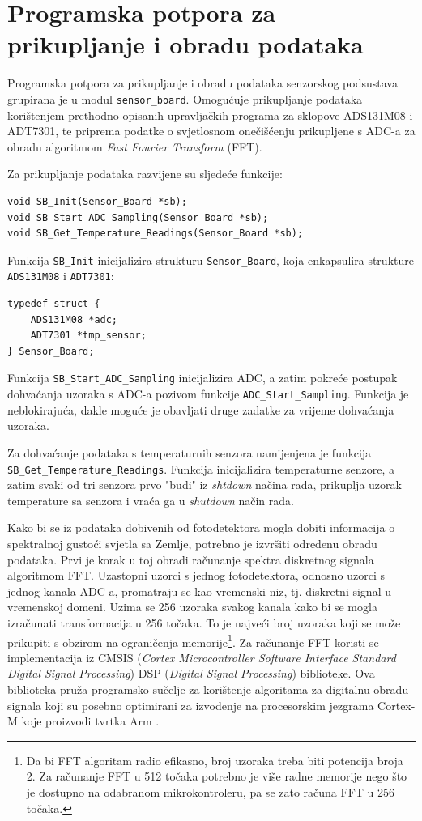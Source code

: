 \section{Programska potpora za prikupljanje i obradu podataka} \label{obrada}

Programska potpora za prikupljanje i obradu podataka senzorskog podsustava grupirana je u modul \texttt{sensor\_board}. Omogućuje prikupljanje podataka korištenjem prethodno opisanih upravljačkih programa za sklopove ADS131M08 i ADT7301, te priprema podatke o svjetlosnom onečišćenju prikupljene s ADC-a za obradu algoritmom \textit{Fast Fourier Transform} (FFT).

Za prikupljanje podataka razvijene su sljedeće funkcije:
\begin{lstlisting}
void SB_Init(Sensor_Board *sb);
void SB_Start_ADC_Sampling(Sensor_Board *sb);
void SB_Get_Temperature_Readings(Sensor_Board *sb);
\end{lstlisting}

Funkcija \texttt{SB\_Init} inicijalizira strukturu \texttt{Sensor\_Board}, koja enkapsulira strukture \texttt{ADS131M08} i \texttt{ADT7301}:
\begin{lstlisting}
typedef struct {
    ADS131M08 *adc;
    ADT7301 *tmp_sensor;
} Sensor_Board;
\end{lstlisting}

Funkcija \texttt{SB\_Start\_ADC\_Sampling} inicijalizira ADC, a zatim pokreće postupak dohvaćanja uzoraka s ADC-a pozivom funkcije \texttt{ADC\_Start\_Sampling}. Funkcija je neblokirajuća, dakle moguće je obavljati druge zadatke za vrijeme dohvaćanja uzoraka.

Za dohvaćanje podataka s temperaturnih senzora namijenjena je funkcija \\\texttt{SB\_Get\_Temperature\_Readings}. Funkcija inicijalizira temperaturne senzore, a zatim svaki od tri senzora prvo "budi" iz \textit{shtdown} načina rada, prikuplja uzorak temperature sa senzora i vraća ga u \textit{shutdown} način rada.

Kako bi se iz podataka dobivenih od fotodetektora mogla dobiti informacija o spektralnoj gustoći svjetla sa Zemlje, potrebno je izvršiti određenu obradu podataka. Prvi je korak u toj obradi računanje spektra diskretnog signala algoritmom FFT. Uzastopni uzorci s jednog fotodetektora, odnosno uzorci s jednog kanala ADC-a, promatraju se kao vremenski niz, tj. diskretni signal u vremenskoj domeni. Uzima se 256 uzoraka svakog kanala kako bi se mogla izračunati transformacija u 256 točaka. To je najveći broj uzoraka koji se može prikupiti s obzirom na ograničenja memorije\footnote{Da bi FFT algoritam radio efikasno, broj uzoraka treba biti potencija broja 2. Za računanje FFT u 512 točaka potrebno je više radne memorije nego što je dostupno na odabranom mikrokontroleru, pa se zato računa FFT u 256 točaka.}. Za računanje FFT koristi se implementacija iz CMSIS (\textit{Cortex Microcontroller Software Interface Standard Digital Signal Processing}) DSP (\textit{Digital Signal Processing}) biblioteke. Ova biblioteka pruža programsko sučelje za korištenje algoritama za digitalnu obradu signala koji su posebno optimirani za izvođenje na procesorskim jezgrama Cortex-M koje proizvodi tvrtka Arm \cite{cmsis_dsp_documentation}.


